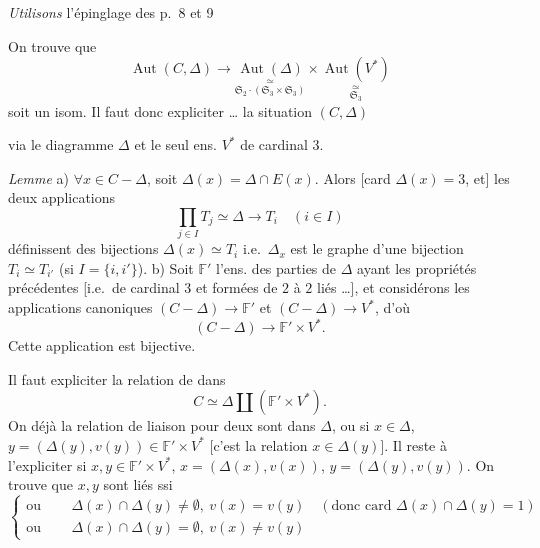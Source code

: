 \documentclass[11pt,a4paper]{article}
\begin{document}
\emph{Utilisons} l'épinglage des p.~8 et 9

On trouve que
\[
\operatorname{Aut}(C, \Delta) \longrightarrow
\underset{\mathfrak{S}_2 \cdot (\mathfrak{S}_3 \times \mathfrak{S}_3)}{\underset{\simeq}{\operatorname{Aut}(\Delta)}}
\times
\underset{\mathfrak{S}_3}{\underset{\simeq}{\operatorname{Aut}(V^{*})}}
\]
soit un isom. Il faut donc expliciter \uncertain{\ill{}} \ldots{}
 \ill{} la situation $(C, \Delta)$


via le diagramme $\Delta$ et le seul ens. $V^{*}$ de cardinal 3.

\emph{Lemme}  a) $\forall x \in C - \Delta$, soit
$\Delta(x) = \Delta \cap E(x)$. Alors [card $\Delta(x) = 3$, et] les deux
applications
\[
\prod_{j \in I} T_j \simeq \Delta \longrightarrow T_i \quad (i \in I)
\]
définissent des bijections $\Delta(x) \simeq T_i$ i.e.\ $\Delta_x$ est le
graphe d'une bijection $T_i \simeq T_{i'}$ (si 
$I = \lbrace i, i' \rbrace$). b) Soit \struck{\ill{}} $\mathbb{F}'$ l'ens.
des parties  de $\Delta$ \struck{\ill{}} ayant les
propriétés précédentes [i.e.\ de cardinal 3 et formées de $2$ à $2$ 
liés \ldots], et considérons les applications canoniques
$(C - \Delta) \to \mathbb{F}'$ et $(C - \Delta) \to V^{*}$, d'où
\[
(C - \Delta) \longrightarrow \mathbb{F}' \times V^{*} .
\]
Cette application est bijective.

Il faut expliciter la relation de  \struck{\ill{}} dans
\[
C \simeq \Delta \amalg (\mathbb{F}' \times V^{*}) .
\]
On  déjà la relation de liaison pour deux  \struck{\ill{}} sont dans $\Delta$, ou si $x \in \Delta$,
$y = (\Delta(y), v(y)) \in \mathbb{F}' \times V^{*}$ [c'est la relation
$x \in \Delta(y)$]. Il reste à l'expliciter si $x, y \in \mathbb{F}' \times V^{*}$,
$x = (\Delta(x), v(x))$, $y = (\Delta(y), v(y))$. On trouve que $x, y$
 sont liés ssi
\[
\begin{cases}
\text{ou bien} & \Delta(x) \cap \Delta(y) \neq \emptyset,\ v(x) = v(y) \quad (\text{donc card } \Delta(x) \cap \Delta(y) = 1) \\
\text{ou bien} & \Delta(x) \cap \Delta(y) = \emptyset,\ v(x) \neq v(y)
\end{cases}
\]
\end{document}
